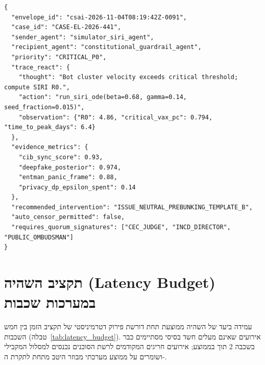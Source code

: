 \begin{otherlanguage}{english}
\begin{tcolorbox}[
  colback=CivicGrayBg, colframe=CivicNavy,
  coltitle=white, colbacktitle=CivicNavy,
  fonttitle=\sffamily\bfseries\footnotesize,
  title={Listing 4.1: CivicShield Inter-Agent Typed Envelope Protocol (Hub -> Constitutional Gate)},
  arc=3pt, boxrule=0.9pt, left=8pt, right=8pt, top=6pt, bottom=6pt
]
\footnotesize
\begin{verbatim}
{
  "envelope_id": "csai-2026-11-04T08:19:42Z-0091",
  "case_id": "CASE-EL-2026-441",
  "sender_agent": "simulator_siri_agent",
  "recipient_agent": "constitutional_guardrail_agent",
  "priority": "CRITICAL_P0",
  "trace_react": {
    "thought": "Bot cluster velocity exceeds critical threshold; compute SIRI R0.",
    "action": "run_siri_ode(beta=0.68, gamma=0.14, seed_fraction=0.015)",
    "observation": {"R0": 4.86, "critical_vax_pc": 0.794, "time_to_peak_days": 6.4}
  },
  "evidence_metrics": {
    "cib_sync_score": 0.93,
    "deepfake_posterior": 0.974,
    "entman_panic_frame": 0.88,
    "privacy_dp_epsilon_spent": 0.14
  },
  "recommended_intervention": "ISSUE_NEUTRAL_PREBUNKING_TEMPLATE_B",
  "auto_censor_permitted": false,
  "requires_quorum_signatures": ["CEC_JUDGE", "INCD_DIRECTOR", "PUBLIC_OMBUDSMAN"]
}
\end{verbatim}
\end{tcolorbox}
\end{otherlanguage}

\section{תקציב השהיה (Latency Budget) במערכות שכבות}
עמידה ביעד  של השהיה ממוצעת תחת  דורשת פירוק דטרמיניסטי של תקציב הזמן בין חמש השכבות (טבלה~\ref{tab:latency_budget}). אירועים שאינם מעלים חשד בסיסי מסתיימים כבר בשכבה 2 תוך  בממוצע; אירועים חריגים המקודמים לרשת הסוכנים נכנסים למסלול המקבילי ושומרים על ממוצע מערכתי מבוזר היטב מתחת לתקרת ה-.

